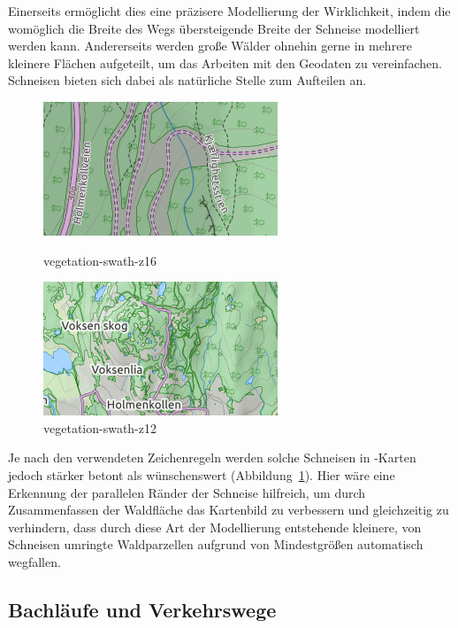 \documentclass[../main/thesis.tex]{subfiles}
\begin{document}
Einerseits ermöglicht dies eine präzisere Modellierung der Wirklichkeit, indem die womöglich die Breite des Wegs übersteigende Breite der Schneise modelliert werden kann.
Andererseits werden große Wälder ohnehin gerne in mehrere kleinere Flächen aufgeteilt, um das Arbeiten mit den Geodaten zu vereinfachen.
Schneisen bieten sich dabei als natürliche Stelle zum Aufteilen an.

\begin{figure}[ht]
  \begin{minipage}{.5\linewidth}
    \centering
    \includegraphics[width=\ScaleIfNeeded]{../chapter3/vegetation-swath-z16}
    \caption{vegetation-swath-z16}\label{fig:vegetation-swath-z16}
  \end{minipage}%
  \begin{minipage}{.5\linewidth}
    \centering
    \includegraphics[width=\ScaleIfNeeded]{../chapter3/vegetation-swath-z12}
    \caption{vegetation-swath-z12}\label{fig:vegetation-swath-z12}
  \end{minipage}
\end{figure}

Je nach den verwendeten Zeichenregeln werden solche Schneisen in \osm-Karten jedoch stärker betont als wünschenswert (Abbildung~\ref{fig:vegetation-swath-z12}).
Hier wäre eine Erkennung der parallelen Ränder der Schneise hilfreich, um durch Zusammenfassen der Waldfläche das Kartenbild zu verbessern und gleichzeitig zu verhindern, dass durch diese Art der Modellierung entstehende kleinere, von Schneisen umringte Waldparzellen aufgrund von Mindestgrößen automatisch wegfallen.


\subsection{Bachläufe und Verkehrswege}
\end{document}
